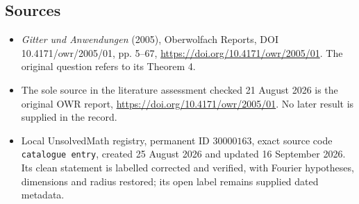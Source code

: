\documentclass[11pt]{article}
\begin{document}
\subsection{Sources}
\begin{itemize}
\item \emph{Gitter und Anwendungen} (2005), Oberwolfach Reports, DOI 10.4171/owr/2005/01, pp. 5--67, \url{https://doi.org/10.4171/owr/2005/01}. The original question refers to its Theorem 4.
\item The sole source in the literature assessment checked 21 August 2026 is the original OWR report, \url{https://doi.org/10.4171/owr/2005/01}. No later result is supplied in the record.
\item Local UnsolvedMath registry, permanent ID $30000163$, exact source code \texttt{catalogue entry}, created 25 August 2026 and updated 16 September 2026. Its clean statement is labelled corrected and verified, with Fourier hypotheses, dimensions and radius restored; its open label remains supplied dated metadata.
\end{itemize}
\end{document}
